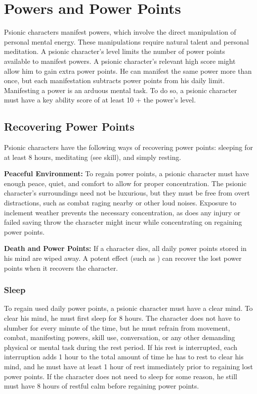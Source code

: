\section{Powers and Power Points}
Psionic characters manifest powers, which involve the direct manipulation of personal mental energy. These manipulations require natural talent and personal meditation. A psionic character's level limits the number of power points available to manifest powers. A psionic character's relevant high score might allow him to gain extra power points. He can manifest the same power more than once, but each manifestation subtracts power points from his daily limit. Manifesting a power is an arduous mental task. To do so, a psionic character must have a key ability score of at least 10 + the power's level.

\subsection{Recovering Power Points}
Psionic characters have the following ways of recovering power points: sleeping for at least 8 hours, meditating (see  skill), and simply resting.

\textbf{Peaceful Environment:} To regain power points, a psionic character must have enough peace, quiet, and comfort to allow for proper concentration. The psionic character's surroundings need not be luxurious, but they must be free from overt distractions, such as combat raging nearby or other loud noises. Exposure to inclement weather prevents the necessary concentration, as does any injury or failed saving throw the character might incur while concentrating on regaining power points.

\textbf{Death and Power Points:} If a character dies, all daily power points stored in his mind are wiped away. A potent effect (such as ) can recover the lost power points when it recovers the character.

\subsubsection{Sleep}
To regain used daily power points, a psionic character must have a clear mind. To clear his mind, he must first sleep for 8 hours. The character does not have to slumber for every minute of the time, but he must refrain from movement, combat, manifesting powers, skill use, conversation, or any other demanding physical or mental task during the rest period. If his rest is interrupted, each interruption adds 1 hour to the total amount of time he has to rest to clear his mind, and he must have at least 1 hour of rest immediately prior to regaining lost power points. If the character does not need to sleep for some reason, he still must have 8 hours of restful calm before regaining power points.


